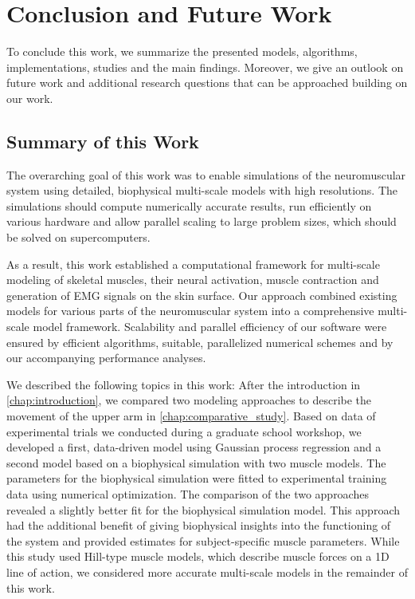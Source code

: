 
\chapter{Conclusion and Future Work}\label{sec:conclusion_and_future_work}
To conclude this work, we summarize the presented models, algorithms, implementations, studies and the main findings. Moreover, we give an outlook on future work and additional research questions that can be approached building on our work.

\section{Summary of this Work}

The overarching goal of this work was to enable simulations of the neuromuscular system using detailed, biophysical multi-scale models with high resolutions. The simulations should compute numerically accurate results, run efficiently on various hardware and allow parallel scaling to large problem sizes, which should be solved on supercomputers.

As a result, this work established a computational framework for multi-scale modeling of skeletal muscles, their neural activation, muscle contraction and generation of EMG signals on the skin surface. Our approach combined existing models for various parts of the neuromuscular system into a comprehensive multi-scale model framework. Scalability and parallel efficiency of our software were ensured by efficient algorithms, suitable, parallelized numerical schemes and by our accompanying performance analyses.


We described the following topics in this work: After the introduction in \cref{chap:introduction}, we compared two modeling approaches to describe the movement of the upper arm in \cref{chap:comparative_study}. Based on data of experimental trials we conducted during a graduate school workshop, we developed a first, data-driven model using Gaussian process regression and a second model based on a biophysical simulation with two muscle models. The parameters for the biophysical simulation were fitted to experimental training data using numerical optimization. The comparison of the two approaches revealed a slightly better fit for the biophysical simulation model. This approach had the additional benefit of giving biophysical insights into the functioning of the system and provided estimates for subject-specific muscle parameters. While this study used Hill-type muscle models, which describe muscle forces on a 1D line of action, we considered more accurate multi-scale models in the remainder of this work.

